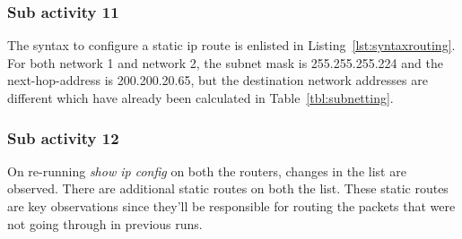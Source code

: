 \documentclass{lab_sheet}
\begin{document}
\begin{mdframed}[backgroundcolor=bg,innerbottommargin=-2.5em]
  
    \end{mdframed}

    \subsubsection*{Sub activity 11}
    The syntax to configure a static ip route is enlisted in Listing~\ref{lst:syntaxrouting}. For both network 1 and network 2, the subnet mask is 255.255.255.224 and the next-hop-address is 200.200.20.65, but the destination network addresses are different which have already been calculated in Table~\ref{tbl:subnetting}.

    \begin{mdframed}[backgroundcolor=bg,innerbottommargin=-2.5em]
      
        \end{mdframed}

        \subsubsection*{Sub activity 12}


        On re-running \textit{show ip config} on both the routers, changes in the list are observed. There are additional static routes on both the list. These static routes are key observations since they'll be responsible for routing the packets that were not going through in previous runs. 
\end{document}
